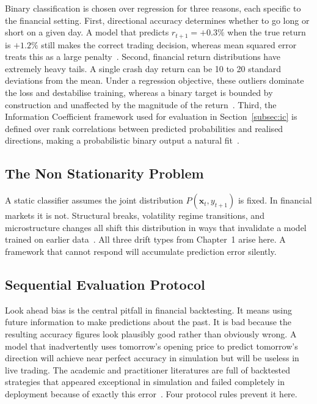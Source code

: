 Binary classification is chosen over regression for three reasons, each specific to the financial setting. First, directional accuracy determines whether to go long or short on a given day. A model that predicts $r_{t+1} = +0.3\%$ when the true return is $+1.2\%$ still makes the correct trading decision, whereas mean squared error treats this as a large penalty~\cite{gu2020}. Second, financial return distributions have extremely heavy tails. A single crash day return can be 10 to 20 standard deviations from the mean. Under a regression objective, these outliers dominate the loss and destabilise training, whereas a binary target is bounded by construction and unaffected by the magnitude of the return~\cite{rapach2013}. Third, the Information Coefficient framework used for evaluation in Section~\ref{subsec:ic} is defined over rank correlations between predicted probabilities and realised directions, making a probabilistic binary output a natural fit~\cite{grinold2000}.

\subsection{The Non Stationarity Problem}

A static classifier assumes the joint distribution $P(\mathbf{x}_t, y_{t+1})$ is fixed. In financial markets it is not. Structural breaks, volatility regime transitions, and microstructure changes all shift this distribution in ways that invalidate a model trained on earlier data~\cite{hamilton1989,lo2004amh}. All three drift types from Chapter~1 arise here. A framework that cannot respond will accumulate prediction error silently.

\subsection{Sequential Evaluation Protocol}

Look ahead bias is the central pitfall in financial backtesting. It means using future information to make predictions about the past. It is bad because the resulting accuracy figures look plausibly good rather than obviously wrong. A model that inadvertently uses tomorrow's opening price to predict tomorrow's direction will achieve near perfect accuracy in simulation but will be useless in live trading. The academic and practitioner literatures are full of backtested strategies that appeared exceptional in simulation and failed completely in deployment because of exactly this error~\cite{rapach2013}. Four protocol rules prevent it here.

